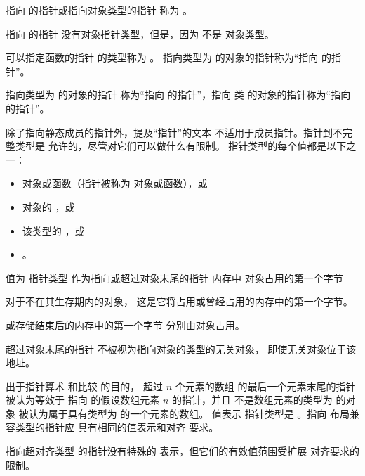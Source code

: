 \pnum
{}%
指向 \cv {} 的指针或指向对象类型的指针
称为 。
\begin{note}
指向  的指针
没有对象指针类型，但是，因为  不是
对象类型。
\end{note}
可以指定函数的指针
的类型称为 。
指向类型为  的对象的指针称为“指向
 的指针”。
\begin{example}
指向类型为  的对象的指针
称为“指向  的指针”，指向
类  的对象的指针称为“指向  的指针”。
\end{example}
除了指向静态成员的指针外，提及“指针”的文本
不适用于成员指针。指针到不完整类型是
允许的，尽管对它们可以做什么有限制。
%
指针类型的每个值都是以下之一：
\begin{itemize}
\item
{} 对象或函数（指针被称为  对象或函数），或
\item
对象的 ，或
\item
{}
该类型的 ，或
\item
{}
。
\end{itemize}
值为
指针类型
作为指向或超过对象末尾的指针
 内存中 对象占用的第一个字节
\begin{footnote}
对于不在其生存期内的对象，
这是它将占用或曾经占用的内存中的第一个字节。
\end{footnote}
或存储结束后的内存中的第一个字节
分别由对象占用。
\begin{note}
超过对象末尾的指针
不被视为指向对象的类型的无关对象，
即使无关对象位于该地址。
\end{note}
出于指针算术
和比较 的目的，
超过 $n$ 个元素的数组  的最后一个元素末尾的指针
被认为等效于
指向  的假设数组元素 $n$ 的指针，并且
不是数组元素的类型为  的对象
被认为属于具有类型为  的一个元素的数组。
值表示
指针类型是 。指向
布局兼容类型的指针应
具有相同的值表示和对齐
要求。
\begin{note}
指向超对齐类型 的指针没有特殊的
表示，但它们的有效值范围受扩展
对齐要求的限制。
\end{note}

